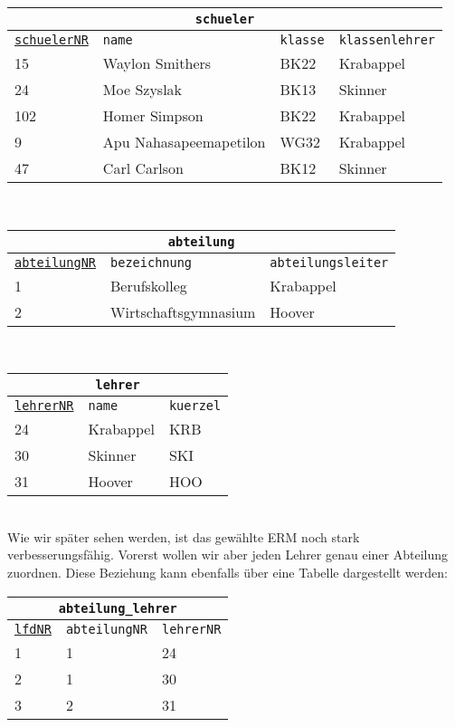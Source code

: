 \begin{tabular}{llll}
	\multicolumn{4}{c}{\lstinline!schueler!}\\
	\hline
	\underline{\lstinline!schuelerNR!}&\lstinline!name!&\lstinline!klasse!&\lstinline!klassenlehrer!\\
	\hline
	15&Waylon Smithers&BK22&Krabappel\\
	24&Moe Szyslak&BK13&Skinner\\
	102&Homer Simpson&BK22&Krabappel\\
	9&Apu Nahasapeemapetilon&WG32&Krabappel\\
	47&Carl Carlson&BK12&Skinner\\
\end{tabular}\\
\begin{tabular}{lll}
	\multicolumn{3}{c}{\lstinline!abteilung!}\\
	\hline
	\underline{\lstinline!abteilungNR!}&\lstinline!bezeichnung!&\lstinline!abteilungsleiter!\\
	\hline
	1&Berufskolleg&Krabappel\\
	2&Wirtschaftsgymnasium&Hoover\\
\end{tabular}\\
\begin{tabular}{lll}
	\multicolumn{3}{c}{\lstinline!lehrer!}\\
	\hline
	\underline{\lstinline!lehrerNR!}&\lstinline!name!&\lstinline!kuerzel!\\
	\hline
	24&Krabappel&KRB\\
	30&Skinner&SKI\\
	31&Hoover&HOO\\
\end{tabular}\\
Wie wir später sehen werden, ist das gewählte ERM noch stark verbesserungsfähig. Vorerst wollen wir aber jeden Lehrer genau einer Abteilung zuordnen. Diese Beziehung kann ebenfalls über eine Tabelle dargestellt werden:

\begin{tabular}{lll}
	\multicolumn{3}{c}{\lstinline!abteilung_lehrer!}\\
	\hline
	\underline{\lstinline!lfdNR!}&\lstinline!abteilungNR!&\lstinline!lehrerNR!\\
	\hline
	1&1&24\\
	2&1&30\\
	3&2&31\\
\end{tabular}

